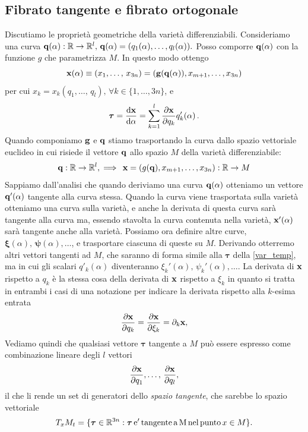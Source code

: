     \subsection{Fibrato tangente e fibrato ortogonale}
    Discutiamo le proprietà geometriche della varietà differenziabili. Consideriamo una curva $\mathbf{q}(\alpha): \mathbb{R} \to \mathbb{R}^l,\, \mathbf{q}(\alpha) = (q_1(\alpha),\dots, q_l(\alpha)).$ Posso comporre $\mathbf{q}(\alpha)$ con la funzione $g$ che parametrizza $M$. In questo modo ottengo
    \begin{equation}
        \mathbf{x}(\alpha) \equiv (x_1,\dots,\,x_{3n}) = (\mathbf{g}(\mathbf{q}(\alpha)),x_{m+1},\dots,x_{3n})
    \end{equation}
    per cui $x_k = x_k(q_1,\dots,\,q_l),\, \forall k \in \{1,\dots,3n\}$, e 
    \begin{equation}
       \boldsymbol{\tau} = \frac{\mathrm{d} \mathbf{x}}{\mathrm{d} \alpha} = \sum_{k=1}^l \frac{\partial \mathbf{x}}{\partial q_k} q'_k(\alpha)\,.
        \label{var_temp}
    \end{equation}
    Quando componiamo $\mathbf{g}$ e $\mathbf{q}$ stiamo trasportando la curva dallo spazio vettoriale euclideo in cui risiede il vettore $\mathbf{q}$ allo spazio $M$ della varietà differenziabile:
    \begin{equation}
        \mathbf{q}: \mathbb{R} \to \mathbb{R}^l,\implies\,\mathbf{x} = (g(\mathbf{q}),x_{m+1},\dots,x_{3n}): \mathbb{R} \to M
    \end{equation}
    Sappiamo dall'analisi che quando deriviamo una curva $\mathbf{q}(\alpha)$ otteniamo un vettore $\mathbf{q}'(\alpha)$ tangente alla curva stessa. Quando la curva viene trasportata sulla varietà otteniamo una curva sulla varietà, e anche la derivata di questa curva sarà tangente alla curva ma, essendo stavolta la curva contenuta nella varietà, $\mathbf{x}'(\alpha)$ sarà tangente anche alla varietà. Possiamo ora definire altre curve, $\boldsymbol{\xi}(\alpha),\,\boldsymbol{\psi}(\alpha),\dots$, e trasportare ciascuna di queste su $M$. Derivando otterremo altri vettori tangenti ad $M$, che saranno di forma simile alla $\boldsymbol{\tau}$ della \ref{var_temp}, ma in cui gli scalari $q'_k(\alpha)$ diventeranno $\xi_k'(\alpha),\, \psi_k'(\alpha),\dots$. La derivata di $\mathbf{x}$ rispetto a $q_k$ è la stessa cosa della derivata di $\mathbf{x}$ rispetto a $\xi_k$ in quanto si tratta in entrambi i casi di una notazione per indicare la derivata rispetto alla $k$-esima entrata
    \begin{equation}
        \frac{\partial \mathbf{x}}{\partial q_k}=\frac{\partial \mathbf{x}}{\partial \xi_k} = \partial_k \mathbf{x},
    \end{equation}
    Vediamo quindi che qualsiasi vettore $\boldsymbol{\tau}$ tangente a $M$ può essere espresso come combinazione lineare degli $l$ vettori
    \begin{equation}
        \frac{\partial \mathbf{x}}{\partial q_1},\dots,\, \frac{\partial \mathbf{x}}{\partial q_l},
    \end{equation}
    il che li rende un set di generatori dello \emph{spazio tangente}, che sarebbe lo spazio vettoriale 
    \begin{equation}
    T_xM_t = \{\boldsymbol{\tau}\in \mathbb{R}^{3n}: \boldsymbol{\tau}\,\mathrm{e'\,tangente\,a\,M\,nel\,punto}\,x \in M\}.
    \end{equation}
    
